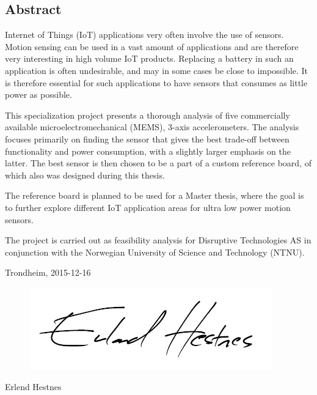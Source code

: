 \begin{center}
\section*{Abstract}
\end{center}

Internet of Things (IoT) applications very often involve the use of sensors. Motion sensing can be used in a vast amount of applications and are therefore very interesting in high volume IoT products. Replacing a battery in such an application is often undesirable, and may in some cases be close to impossible. It is therefore essential for such applications to have sensors that consumes as little power as possible. 

This specialization project presents a thorough analysis of five commercially available microelectromechanical (MEMS), 3-axis accelerometers. The analysis focuses primarily on finding the sensor that gives the best trade-off between functionality and power consumption, with a slightly larger emphasis on the latter. The best sensor is then chosen to be a part of a custom reference board, of which also was designed during this thesis.

The reference board is planned to be used for a Master thesis, where the goal is to further explore different IoT application areas for ultra low power motion sensors.

The project is carried out as feasibility analysis for Disruptive Technologies AS in conjunction with the Norwegian University of Science and Technology (NTNU).

\begin{center}
Trondheim, 2015-12-16\\[1pc]
\begin{figure}[h]
\centering
\includegraphics[scale=0.5]{fig/underskrift.png}
\label{fig:underskrift}
\end{figure}
Erlend Hestnes
\end{center}